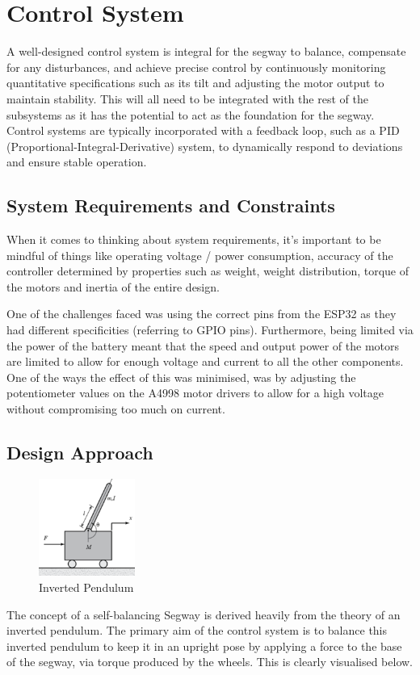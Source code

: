 \section{Control System}

A well-designed control system is integral for the segway to balance, compensate for any disturbances, and achieve precise control by continuously monitoring quantitative specifications such as its tilt and adjusting the motor output to maintain stability. This will all need to be integrated with the rest of the subsystems as it has the potential to act as the foundation for the segway. Control systems are typically incorporated with a feedback loop, such as a PID (Proportional-Integral-Derivative) system, to dynamically respond to deviations and ensure stable operation.

\subsection{System Requirements and Constraints}

When it comes to thinking about system requirements, it’s important to be mindful of things like operating voltage / power consumption, accuracy of the controller determined by properties such as weight, weight distribution, torque of the motors and inertia of the entire design.

One of the challenges faced was using the correct pins from the ESP32 as they had different specificities (referring to GPIO pins). Furthermore, being limited via the power of the battery meant that the speed and output power of the motors are limited to allow for enough voltage and current to all the other components. One of the ways the effect of this was minimised, was by adjusting the potentiometer values on the A4998 motor drivers to allow for a high voltage without compromising too much on current. 

\subsection{Design Approach}
\begin{figure}
    \centerline{\includegraphics[width=0.28\textwidth]{images/balance.png}}
    \caption{Inverted Pendulum~\cite{ref:pendulum}}
    \label{fig:balance}
\end{figure}
The concept of a self-balancing Segway is derived heavily from the theory of an inverted pendulum. The primary aim of the control system is to balance this inverted pendulum to keep it in an upright pose by applying a force to the base of the segway, via torque produced by the wheels. This is clearly visualised below.


